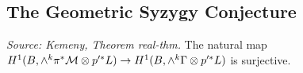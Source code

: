 \subsection{The Geometric Syzygy Conjecture}

\begin{theorem}
  \label{thm:kemeny_real_thm}
  \textit{Source: Kemeny, Theorem real-thm.}
  The natural map
  \(H^1(B,\wedge^k\pi^*\mathcal{M}\otimes p'^*L)\to
    H^1(B,\wedge^k\Gamma\otimes p'^*L)\)
  is surjective.
\end{theorem}

